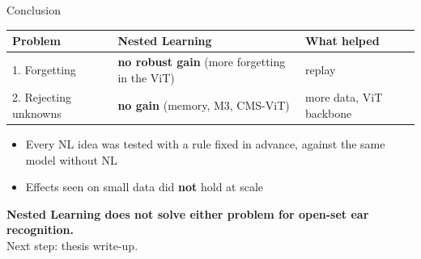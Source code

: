 \documentclass[aspectratio=169,10pt]{beamer}
\newcommand{\down}[1]{\textcolor{bad}{\textbf{#1}}}
\newcommand{\takeaway}[1]{\vfill\begin{center}\colorbox{accent!10}{\parbox{0.92\textwidth}{\centering\vspace{3pt}#1\vspace{3pt}}}\end{center}}
\begin{document}
\begin{frame}{Conclusion}
\begin{center}
\small
\begin{tabular}{lll}
\toprule
\textbf{Problem} & \textbf{Nested Learning} & \textbf{What helped}\\
\midrule
1. Forgetting & \down{no robust gain} (more forgetting in the ViT) & replay\\
2. Rejecting unknowns & \down{no gain} (memory, M3, CMS-ViT) & more data, ViT backbone\\
\bottomrule
\end{tabular}
\end{center}

\bigskip
\begin{itemize}
  \item Every NL idea was tested with a rule fixed in advance, against the same model without NL
  \item Effects seen on small data did \textbf{not} hold at scale
\end{itemize}

\takeaway{\textbf{Nested Learning does not solve either problem for open-set ear recognition.}\\ Next step: thesis write-up.}
\end{frame}
\end{document}
